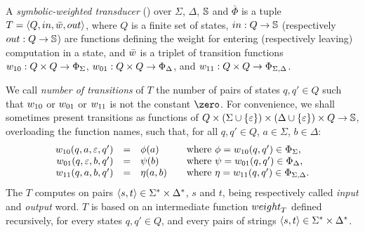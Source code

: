 \begin{definition}
\label{def:transducer} \label{def:SWT}
A \emph{symbolic-weighted transducer} (\SWT)
over $\Sigma$, $\Delta$, $\mathbb{S}$ and $\bar\Phi$
is a tuple
$T = \< Q, \init, \bar{\wei}, \final >$,
where $Q$ is a finite set of states,
$\mathsf{in} : Q \to \Semiring$   %
(respectively $\mathsf{out} : Q \to \Semiring$)  %
are functions defining the weight for entering
(respectively leaving) computation in a state,
and $\bar{\wei}$ is a triplet of transition functions
$\wei_{10}: Q \times Q \to \Phi_{\Sigma}$,
$\wei_{01}: Q \times Q \to \Phi_{\Delta}$, and
$\wei_{11}: Q \times Q \to \Phi_{\Sigma, \Delta}$.
\end{definition}
%
\noindent
We call \emph{number of transitions} of $T$ the number of pairs of states
$q, q' \in Q$ such that $\wei_{10}$ or $\wei_{01}$ or $\wei_{11}$
is not the constant $\zero$.
%
\noindent
For convenience, we shall sometimes present transitions
as functions of
$Q \times (\Sigma \cup \{ \varepsilon \}) \times (\Delta \cup \{ \varepsilon \}) \times Q \to \mathbb{S}$,
overloading the function names,
such that, for all $q, q' \in Q$, $a \in \Sigma$,  $b \in \Delta$:
\[
\begin{array}{rcll}
\wei_{10}(q, a, \varepsilon, q') & = & \phi(a) & %
\quad\mathrm{where~} \phi = \wei_{10}(q, q') \in \Phi_\Sigma,\\
\wei_{01}(q, \varepsilon, b, q') & = & \psi(b) &
\quad\mathrm{where~} \psi = \wei_{01}(q, q') \in \Phi_\Delta,\\
\wei_{11}(q, a, b, q') & = & \eta(a, b) &
\quad\mathrm{where~} \eta = \wei_{11}(q, q') \in \Phi_{\Sigma, \Delta}.\\
\end{array}
\]
%
\noindent
The \SWT $T$ computes on pairs $\< s, t> \in \Sigma^* \times \Delta^*$,
$s$ and $t$, being respectively called \emph{input} and \emph{output} word.
$T$ is
based on an intermediate function $\weight_T$
defined recursively, for every states $q, q' \in Q$,
and every pairs of strings $\< s, t> \in \Sigma^* \times \Delta^*$.
%
